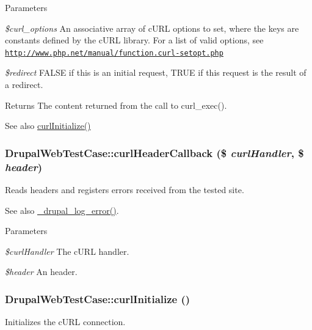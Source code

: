 \begin{DoxyParams}{Parameters}
\item[{\em \$curl\_\-options}]An associative array of cURL options to set, where the keys are constants defined by the cURL library. For a list of valid options, see \href{http://www.php.net/manual/function.curl-setopt.php}{\tt http://www.php.net/manual/function.curl-\/setopt.php} \item[{\em \$redirect}]FALSE if this is an initial request, TRUE if this request is the result of a redirect.\end{DoxyParams}
\begin{DoxyReturn}{Returns}
The content returned from the call to curl\_\-exec().
\end{DoxyReturn}
\begin{DoxySeeAlso}{See also}
\hyperlink{classDrupalWebTestCase_a8c51d47f5b89aad9f5e7fc4fa001bf05}{curlInitialize()} 
\end{DoxySeeAlso}
\hypertarget{classDrupalWebTestCase_a7993c14e1d81d759a6b3903764bb0e46}{
\subsubsection[{curlHeaderCallback}]{\setlength{\rightskip}{0pt plus 5cm}DrupalWebTestCase::curlHeaderCallback (\$ {\em curlHandler}, \/  \$ {\em header})}}
\label{classDrupalWebTestCase_a7993c14e1d81d759a6b3903764bb0e46}
Reads headers and registers errors received from the tested site.

\begin{DoxySeeAlso}{See also}
\hyperlink{errors_8inc_adae530f2d49e1067ab4e9dd5753e387a}{\_\-drupal\_\-log\_\-error()}.
\end{DoxySeeAlso}

\begin{DoxyParams}{Parameters}
\item[{\em \$curlHandler}]The cURL handler. \item[{\em \$header}]An header. \end{DoxyParams}
\hypertarget{classDrupalWebTestCase_a8c51d47f5b89aad9f5e7fc4fa001bf05}{
\subsubsection[{curlInitialize}]{\setlength{\rightskip}{0pt plus 5cm}DrupalWebTestCase::curlInitialize ()}}
\label{classDrupalWebTestCase_a8c51d47f5b89aad9f5e7fc4fa001bf05}
Initializes the cURL connection.

